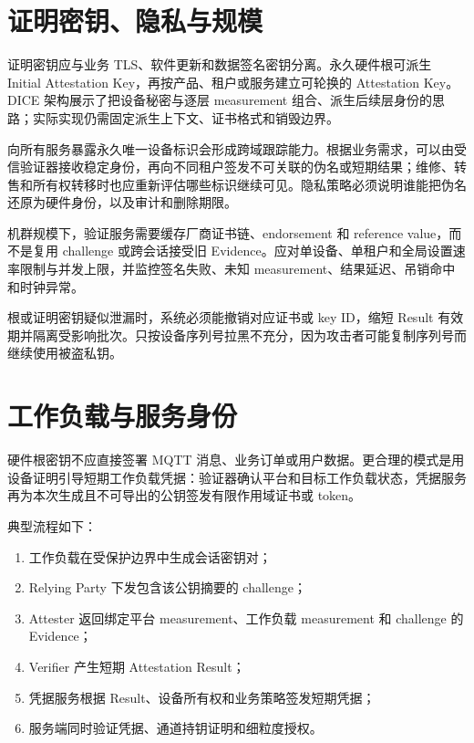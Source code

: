 \section{证明密钥、隐私与规模}

证明密钥应与业务 TLS、软件更新和数据签名密钥分离。永久硬件根可派生 Initial Attestation Key，再按产品、租户或服务建立可轮换的 Attestation Key。DICE 架构展示了把设备秘密与逐层 measurement 组合、派生后续层身份的思路\cite{tcg-dice-architectures}；实际实现仍需固定派生上下文、证书格式和销毁边界。

向所有服务暴露永久唯一设备标识会形成跨域跟踪能力。根据业务需求，可以由受信验证器接收稳定身份，再向不同租户签发不可关联的伪名或短期结果；维修、转售和所有权转移时也应重新评估哪些标识继续可见。隐私策略必须说明谁能把伪名还原为硬件身份，以及审计和删除期限。

机群规模下，验证服务需要缓存厂商证书链、endorsement 和 reference value，而不是复用 challenge 或跨会话接受旧 Evidence。应对单设备、单租户和全局设置速率限制与并发上限，并监控签名失败、未知 measurement、结果延迟、吊销命中和时钟异常。

根或证明密钥疑似泄漏时，系统必须能撤销对应证书或 key ID，缩短 Result 有效期并隔离受影响批次。只按设备序列号拉黑不充分，因为攻击者可能复制序列号而继续使用被盗私钥。

\section{工作负载与服务身份}

硬件根密钥不应直接签署 MQTT 消息、业务订单或用户数据。更合理的模式是用设备证明引导短期工作负载凭据：验证器确认平台和目标工作负载状态，凭据服务再为本次生成且不可导出的公钥签发有限作用域证书或 token。

典型流程如下：

\begin{enumerate}
  \item 工作负载在受保护边界中生成会话密钥对；
  \item Relying Party 下发包含该公钥摘要的 challenge；
  \item Attester 返回绑定平台 measurement、工作负载 measurement 和 challenge 的 Evidence；
  \item Verifier 产生短期 Attestation Result；
  \item 凭据服务根据 Result、设备所有权和业务策略签发短期凭据；
  \item 服务端同时验证凭据、通道持钥证明和细粒度授权。
\end{enumerate}

